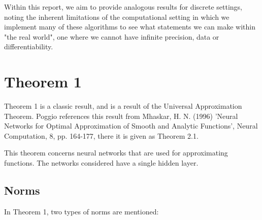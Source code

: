 \documentclass{article}
\begin{document}
Within this report, we aim to provide analogous results for discrete settings, noting the inherent limitations of the computational setting in which we implement many of these algorithms to see what statements we can make within "the real world", one where we cannot have infinite precision, data or differentiability.

\section{Theorem 1}

Theorem 1 is a classic result, and is a result of the Universal Approximation Theorem. Poggio references this result from Mhaskar, H. N. (1996) 'Neural Networks for Optimal Approximation of Smooth and Analytic Functions', Neural Computation, 8, pp. 164-177, there it is given as Theorem 2.1.

This theorem concerns neural networks that are used for approximating functions. The networks considered have a single hidden layer.

\subsection{Norms}

In Theorem 1, two types of norms are mentioned:
\end{document}
